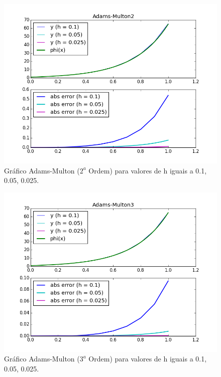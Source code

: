 \documentclass[a4paper]{article}
\begin{document}
\begin{figure}[b]
\centering
\includegraphics[width=1.0\textwidth]{plots/Adams-Multon2.png}
\caption{\label{fig:multon2}Gráfico Adams-Multon ($2^a$ Ordem) para valores de h iguais a 0.1, 0.05, 0.025.}
\end{figure}


\begin{figure}[b]
\centering
\includegraphics[width=1.0\textwidth]{plots/Adams-Multon3.png}
\caption{\label{fig:multon3}Gráfico Adams-Multon ($3^a$ Ordem) para valores de h iguais a 0.1, 0.05, 0.025.}
\end{figure}
\end{document}
